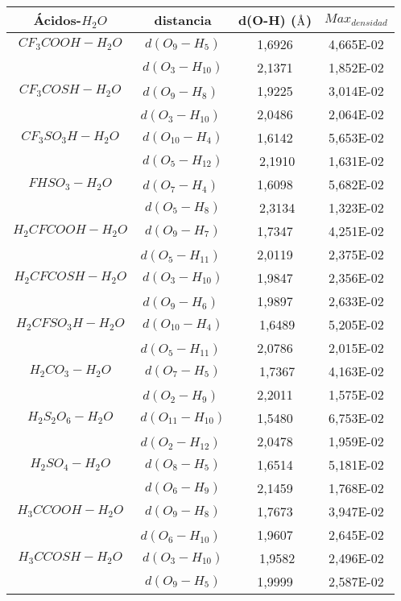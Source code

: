 \begin{table}[H]
	\centering
	\begin{tabular}{|c|c|c|c|}
		\hline
		Ácidos-$H_2O$ & distancia	& d(O-H) ($\mbox{\normalfont\AA}$) & $Max_{densidad}$ \\ \hline
	 $CF_3COOH-H_2O$	& $d(O_9-H_5)$ &	﻿1,6926	& 4,665E-02 \\ \cline{2-4}
	& $d(O_3-H_{10})$ &	﻿2,1371 &	1,852E-02 \\ \hline
 $CF_3COSH-H_2O$ &	$d(O_9-H_8)$	﻿& 1,9225 &	3,014E-02 \\ \cline{2-4}
	& $d(O_3-H_{10})$	﻿& 2,0486 &	2,064E-02 \\ \hline
 $CF_3SO_3H-H_2O$&	$d(O_{10}-H_4)$ &	﻿1,6142	& 5,653E-02 \\ \cline{2-4}
	& $d(O_5-H_{12})$	&﻿ 2,1910 &	1,631E-02 \\ \hline
 $FHSO_3-H_2O$	& $d(O_7-H_4)$	﻿& 1,6098 &	5,682E-02 \\ \cline{2-4}
	& $d(O_5-H_8)$	&﻿ 2,3134	& 1,323E-02 \\ \hline
 $H_2CFCOOH-H_2O$	&$d(O_9-H_7)$ &	﻿1,7347	& 4,251E-02 \\ \cline{2-4}
	& $d(O_5-H_{11})$	﻿& 2,0119	& 2,375E-02 \\ \hline
 $H_2CFCOSH-H_2O$ &	$d(O_3-H_{10})$ &	﻿1,9847 &	2,356E-02 \\ \cline{2-4}
	& $d(O_9-H_6)$ ﻿& 1,9897	& 2,633E-02 \\ \hline
 $H_2CFSO_3H-H_2O$ &	$d(O_{10}-H_4)$	&﻿ 1,6489	& 5,205E-02 \\ \cline{2-4}
	& $d(O_5-H_{11})$	﻿& 2,0786	& 2,015E-02 \\ \hline
 $H_2CO_3-H_2O$	& $d(O_7-H_5)$	&﻿ 1,7367	& 4,163E-02 \\ \cline{2-4}
	& $d(O_2-H_9)$	﻿& 2,2011	& 1,575E-02 \\ \hline
 $H_2S_2O_6-H_2O$ &	$d(O_{11}-H_{10})$	& ﻿1,5480 &	6,753E-02 \\ \cline{2-4}
	& $d(O_2-H_{12})$	﻿& 2,0478 &	1,959E-02 \\ \hline
 $H_2SO_4-H_2O$	& $d(O_8-H_5)$ &	﻿1,6514	& 5,181E-02 \\ \cline{2-4}
	& $d(O_6-H_9)$ &	﻿2,1459	& 1,768E-02 \\ \hline
 $H_3CCOOH-H_2O$	& $d(O_9-H_8)$ &	﻿1,7673	& 3,947E-02 \\ \cline{2-4}
	& $d(O_6-H_{10})$	﻿& 1,9607 &	2,645E-02 \\ \hline
 $H_3CCOSH-H_2O$ &	$d(O_3-H_{10})$	&﻿ 1,9582 &	2,496E-02 \\ \cline{2-4}
	& $d(O_9-H_5)$	& ﻿1,9999	& 2,587E-02 \\ \hline

\end{tabular}
\end{table}
